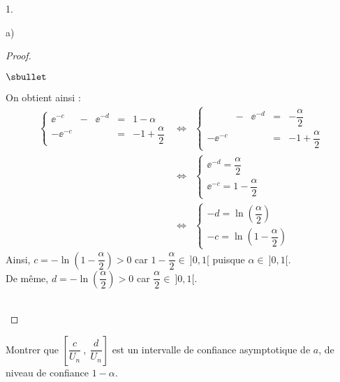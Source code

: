 \documentclass[11pt]{article}%
\begin{document}
\begin{noliste}{1.}
\begin{noliste}{a)}
\begin{proof}
\begin{noliste}{$\sbullet$}
      \item On obtient ainsi :
        \[
        \begin{array}{rcl}
          \left\{
            \begin{array}{ccccc}
              \ee^{-c} & - & \ee^{-d} & = & 1 - \alpha \\[.4cm]
              -\ee^{-c} & & & = & -1 + \dfrac{\alpha}{2}
            \end{array}
          \right. %
          & \Leftrightarrow &
          \left\{
            \begin{array}{ccccc}
              & - & \ee^{-d} & = & - \dfrac{\alpha}{2} \\[.4cm]
              - \ee^{-c} & & & = & -1 + \dfrac{\alpha}{2}
            \end{array}
          \right. \\[1cm]
          & \Leftrightarrow &
          \left\{
            \begin{array}{l}
              \ee^{-d} = \dfrac{\alpha}{2} \\[.4cm]
              \ee^{-c} = 1 - \dfrac{\alpha}{2}
            \end{array}
          \right. \\[1cm]
          & \Leftrightarrow &
          \left\{
            \begin{array}{l}
              -d = \ln\left( \dfrac{\alpha}{2} \right) \\[.4cm]
              -c = \ln\left(1 - \dfrac{\alpha}{2} \right)
            \end{array}
          \right.
        \end{array}
        \]
        Ainsi, $c = -\ln\left(1 - \dfrac{\alpha}{2} \right) > 0$ car
        $1 - \dfrac{\alpha}{2} \in \ ]0,1[$ puisque $\alpha \in \
        ]0,1[$.\\[.2cm]
        De même, $d = - \ln\left( \dfrac{\alpha}{2} \right) > 0$ car
        $\dfrac{\alpha}{2} \in \ ]0,1[$.
      \end{noliste}
      \conc{$c = -\ln\left(1 - \dfrac{\alpha}{2} \right)$ \quad et
        \quad $d = - \ln\left( \dfrac{\alpha}{2} \right)$}
      ~\\[-1.4cm]
    \end{proof}




  \item Montrer que $\left[ \dfrac{c}{U_n} \ , \ \dfrac{d}{U_n} \right]$
    est un intervalle de confiance asymptotique de $a$, de niveau de
    confiance $1-\alpha$.


\end{noliste}
\end{noliste}
\end{document}
